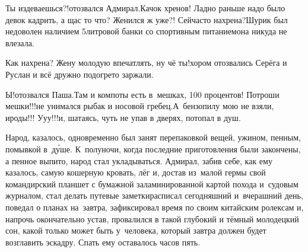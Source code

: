 \diagdash Ты издеваешься?!\mdash отозвался Адмирал.\mdash Качок хренов! Ладно раньше надо было девок кадрить, а щас то что? Женился ж уже?! Сейчас\sdash то нахрена?\mdash Шурик был недоволен наличием 5\sdash литровой банки со спортивным питанием\mdash она никуда не влезала.

\diagdash Как нахрена? Жену молодую впечатлять, ну чё ты!\mdash хором отозвались Серёга и Руслан и всё дружно подогрето заржали.

\diagdash Ы!\mdash отозвался Паша.\mdash Там и компоты есть в~мешках, 100 процентов! Потроши мешки!!!\mdash не унимался рыбак и носовой гребец.\mdash А~бензопилу мою не взяли, ироды!!! У\sdash у\sdash у!!!\mdash и, шатаясь, чуть не упав в дверях, потопал в душ.

Народ, казалось, одновременно был занят перепаковкой вещей, ужином, пенным, помывкой в~д\'{у}ше. К~полуночи, когда последние приготовления были закончены, а пенное выпито, народ стал укладываться. Адмирал, забив себе, как ему казалось, самую кошерную кровать, лёг и, достав из~малой гермы свой командирский планшет с бумажной заламинированной картой похода и~судовым журналом, стал делать путевые заметки\mdash расписал сегодняшний и~вчерашний день, поведал о планах на~завтра, зафиксировал время по своим китайским ролексам и, напрочь окончательно устав, провалился в такой глубокий и тёмный молодецкий сон, какой только может быть у~человека, который завтра должен будет возглавить эскадру. Спать ему оставалось часов пять.

\begin{center}
\end{center}

 






